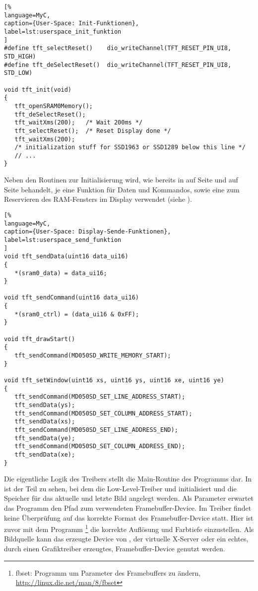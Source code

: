 \begin{lstlisting}[%
language=MyC,
caption={User-Space: Init-Funktionen},
label=lst:userspace_init_funktion
]
#define tft_selectReset()    dio_writeChannel(TFT_RESET_PIN_UI8, STD_HIGH)
#define tft_deSelectReset()  dio_writeChannel(TFT_RESET_PIN_UI8, STD_LOW)

void tft_init(void)
{
   tft_openSRAM0Memory();
   tft_deSelectReset();
   tft_waitXms(200);   /* Wait 200ms */
   tft_selectReset();  /* Reset Display done */
   tft_waitXms(200);
   /* initialization stuff for SSD1963 or SSD1289 below this line */
   // ...
}
\end{lstlisting}
Neben den Routinen zur Initialisierung wird, wie bereits in  auf Seite \pageref{lst:apex_erster_teil} und  auf Seite \pageref{lst:send_funktion} behandelt, je eine Funktion für Daten und Kommandos, sowie eine zum Reservieren des RAM-Fensters im Display verwendet (siehe ).

\begin{lstlisting}[%
language=MyC,
caption={User-Space: Display-Sende-Funktionen},
label=lst:userspace_send_funktion
]
void tft_sendData(uint16 data_ui16)
{
   *(sram0_data) = data_ui16;
}

void tft_sendCommand(uint16 data_ui16)
{
   *(sram0_ctrl) = (data_ui16 & 0xFF);
}

void tft_drawStart()
{
   tft_sendCommand(MD050SD_WRITE_MEMORY_START);
}

void tft_setWindow(uint16 xs, uint16 ys, uint16 xe, uint16 ye)
{
   tft_sendCommand(MD050SD_SET_LINE_ADDRESS_START);
   tft_sendData(ys);
   tft_sendCommand(MD050SD_SET_COLUMN_ADDRESS_START);
   tft_sendData(xs);
   tft_sendCommand(MD050SD_SET_LINE_ADDRESS_END);
   tft_sendData(ye);
   tft_sendCommand(MD050SD_SET_COLUMN_ADDRESS_END);
   tft_sendData(xe);
}
\end{lstlisting}
\newpage
Die eigentliche Logik des Treibers stellt die Main-Routine des Programms dar. In  ist der Teil zu sehen, bei dem die Low-Level-Treiber  und  initialisiert und die Speicher für das aktuelle und letzte Bild angelegt werden. Als Parameter erwartet das Programm den Pfad zum verwendeten Framebuffer-Device. Im Treiber findet keine Überprüfung auf das korrekte Format des Framebuffer-Device statt. Hier ist zuvor mit dem Programm \footnote{fbset: Programm um Parameter des Framebuffers zu ändern, \url{http://linux.die.net/man/8/fbset}} die korrekte Auflösung und Farbtiefe einzustellen. Als Bildquelle kann das erzeugte Device  von , der virtuelle X-Server  oder ein echtes, durch einen Grafiktreiber erzeugtes, Framebuffer-Device genutzt werden. 

